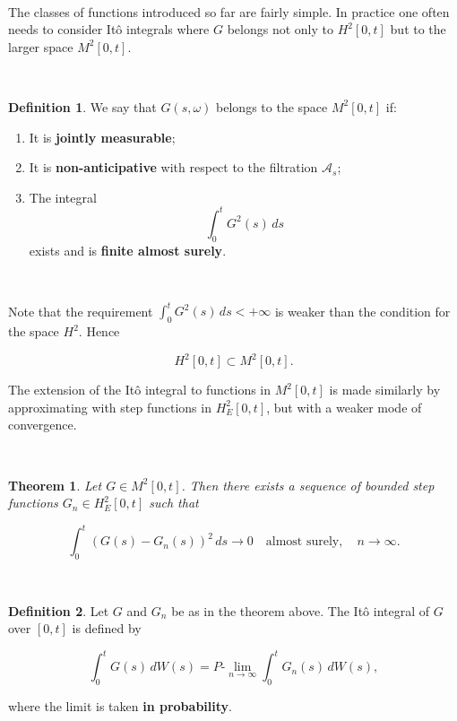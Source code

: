 \documentclass[
  11pt,
  a4paper,
]{book}
\newtheorem{theorem}{Theorem}[chapter]
\theoremstyle{definition}
\newtheorem{definition}{Definition}[chapter]
\theoremstyle{definition}
\theoremstyle{definition}
\theoremstyle{definition}
\theoremstyle{remark}
\begin{document}
\(\,\)

The classes of functions introduced so far are fairly simple. In practice one often needs to consider Itô integrals where \(G\) belongs not only to \(H^2[0,t]\) but to the larger space \(M^2[0,t]\).

\(\,\)

\begin{definition}

We say that \(G(s,\omega)\) belongs to the space \(M^2[0,t]\) if:

\begin{enumerate}
\def\labelenumi{\arabic{enumi}.}
\item
  It is \textbf{jointly measurable};
\item
  It is \textbf{non-anticipative} with respect to the filtration \(\mathcal{A}_s\);
\item
  The integral
  \[
  \int_0^t G^2(s)\,ds
  \]
  exists and is \textbf{finite almost surely}.
\end{enumerate}

\end{definition}

\(\,\)

Note that the requirement \(\int_0^t G^2(s)\,ds < +\infty\) is weaker than the condition for the space \(H^2\). Hence

\[
H^2[0,t] \subset M^2[0,t].
\]

The extension of the Itô integral to functions in \(M^2[0,t]\) is made similarly by approximating with step functions in \(H_E^2[0,t]\), but with a weaker mode of convergence.

\(\,\)

\begin{theorem}
Let \(G\in M^2[0,t]\). Then there exists a sequence of bounded step functions \(G_n\in H_E^2[0,t]\) such that

\[
\int_0^t (G(s)-G_n(s))^2\,ds \longrightarrow 0 \quad \text{almost surely},\quad n\to\infty.
\]
\end{theorem}

\(\,\)

\begin{definition}
Let \(G\) and \(G_n\) be as in the theorem above. The Itô integral of \(G\) over \([0,t]\) is defined by

\[
\int_0^t G(s)\,dW(s) = P\mbox{-}\lim_{n\to\infty} \int_0^t G_n(s)\,dW(s),
\]

where the limit is taken \textbf{in probability}.
\end{definition}
\end{document}

